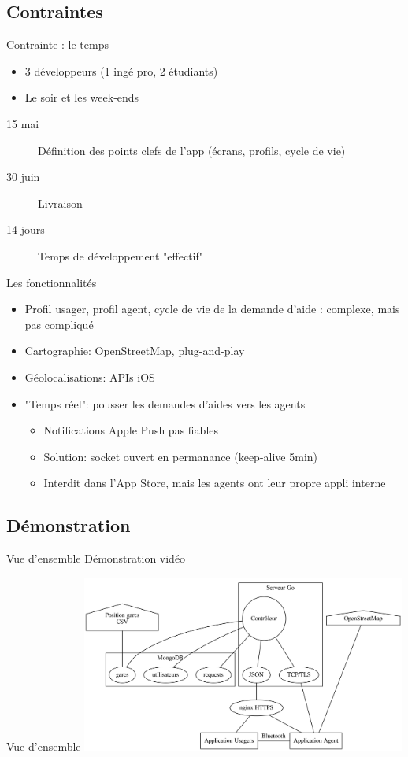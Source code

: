 \documentclass{beamer}
\begin{document}
\subsection{Contraintes}
\begin{frame}{Contrainte : le temps}
    \begin{itemize}
        \item 3 développeurs (1 ingé pro, 2 étudiants)
        \item Le soir et les week-ends
    \end{itemize}
    \begin{description}
        \item[15 mai] Définition des points clefs de l'app (écrans, profils, cycle de vie)
        \item[30 juin] Livraison
        \item[14 jours] Temps de développement "effectif"
    \end{description}
\end{frame}
\begin{frame}{Les fonctionnalités}
    \begin{itemize}
        \item Profil usager, profil agent, cycle de vie de la demande d'aide : complexe, mais pas compliqué
        \item Cartographie: OpenStreetMap, plug-and-play
        \item Géolocalisations: APIs iOS
        \item "Temps réel": pousser les demandes d'aides vers les agents
            \begin{itemize}
                \item Notifications Apple Push pas fiables
                \item Solution: socket ouvert en permanance (keep-alive 5min)
                \item Interdit dans l'App Store, mais les agents ont leur propre appli interne
            \end{itemize}
    \end{itemize}
\end{frame}
\subsection{Démonstration}
\begin{frame}{Vue d'ensemble}
    Démonstration vidéo
\end{frame}
\begin{frame}{Vue d'ensemble}
    \includegraphics[width=0.8\textwidth]{general.png}
\end{frame}
\end{document}
